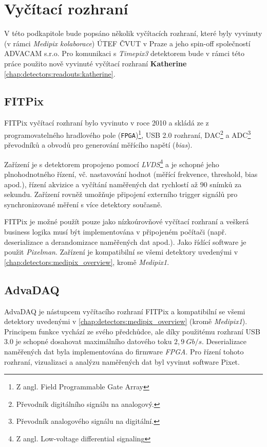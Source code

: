 \section{Vyčítací rozhraní}\label{chap:detectors:readouts}
V této podkapitole bude popsáno několik vyčítacích rozhraní, které byly vyvinuty (v rámci \textit{Medipix kolaborace}) ÚTEF ČVUT v Praze a jeho spin-off společností ADVACAM s.r.o. Pro komunikaci s \textit{Timepix3} detektorem bude v rámci této práce použito nově vyvinuté vyčítací rozhraní \textbf{Katherine} \cite{Katherine} \ref{chap:detectors:readouts:katherine}.

\subsection{FITPix}
FITPix \cite{fitpix} vyčítací rozhraní bylo vyvinuto v roce 2010 a skládá ze z programovatelného hradlového pole (\texttt{FPGA})\footnote{Z angl. Field Programmable Gate Array}, USB 2.0 rozhraní, DAC\footnote{Převodník digitálního signálu na analogový.} a ADC\footnote{Převodník analogového signálu na digitální.} převodníků a obvodů pro generování měřícího napětí (\textit{bias}).

Zařízení je s detektorem propojeno pomocí \textit{LVDS}\footnote{Z angl. Low-voltage differential signaling} a je schopné jeho plnohodnotného řízení, vč. nastavování hodnot (měřící frekvence, threshold, bias apod.), řízení akvizice a vyčítání naměřených dat rychlostí až $90$ snímků za sekundu. Zařízení rovněž umožňuje připojení externího trigger signálů pro synchronizované měření s více detektory současně.

FITPix je možné použít pouze jako nízkoúrovňové vyčítací rozhraní a veškerá business logika musí být implementována v připojeném počítači (např. deserializace a derandomizace naměřených dat apod.). Jako řídící software je použit \textit{Pixelman}\cite{pixelman}. Zařízení je kompatibilní se všemi detektory uvedenými v \ref{chap:detectors:medipix_overview}, kromě \textit{Medipix1}.

\subsection{AdvaDAQ}
AdvaDAQ \cite{Turecek2016TimeWakl} je nástupcem vyčítacího rozhraní FITPix a kompatibilní se všemi detektory uvedenými v \ref{chap:detectors:medipix_overview} (kromě \textit{Medipix1}). Principem funkce vychází ze svého předchůdce, ale díky použitému rozhraní USB 3.0 je schopné dosahovat maximálního datového toku $2,9~Gb/s$. Deserializace naměřených dat byla implementována do firmware \textit{FPGA}. Pro řízení tohoto rozhraní, vizualizaci a analýzu naměřených dat byl vyvinut software Pixet.

